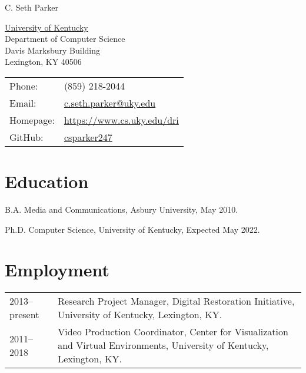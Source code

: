 \documentclass[letterpaper]{article}
\def\name{C. Seth Parker}
\renewenvironment{itemize}{
  \begin{list}{}{
    \setlength{\leftmargin}{1.5em}
  }
}{
  \end{list}
}
\begin{document}
{\huge \name}


\vspace{0.25in}

\begin{minipage}{0.45\linewidth}
  \href{http://www.uky.edu/}{University of Kentucky} \\
  Department of Computer Science \\
  Davis Marksbury Building \\
  Lexington, KY 40506
\end{minipage}
\begin{minipage}{0.45\linewidth}
  \begin{tabular}{ll}
    Phone: & (859) 218-2044 \\
    Email: & \href{mailto:c.seth.parker@uky.edu}{c.seth.parker@uky.edu} \\
    Homepage: & \href{https://www.cs.uky.edu/dri}{https://www.cs.uky.edu/dri} \\
    GitHub: & \href{https://www.github.com/csparker247}{csparker247} \\
  \end{tabular}
\end{minipage}


%


\section*{Education}

\begin{itemize}
  \item B.A. Media and Communications, Asbury University, May 2010.

  \item Ph.D. Computer Science, University of Kentucky, Expected May 2022.
\end{itemize}


\section*{Employment}
\renewcommand{\arraystretch}{1.5}
\begin{tabularx}{\linewidth}{lX}
  2013--present & Research Project Manager, Digital Restoration Initiative, University of Kentucky, Lexington, KY. \\
  2011--2018 & Video Production Coordinator, Center for Visualization and Virtual Environments, University of Kentucky, Lexington, KY. \\
\end{tabularx}
\end{document}
